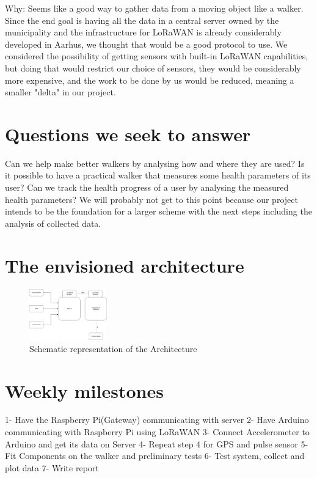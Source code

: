 \documentclass[conference]{IEEEtran}
\begin{document}
Why: Seems like a good way to gather data from a moving object like a walker. Since the end goal is having all the data in a central server owned by the municipality and the infrastructure for LoRaWAN is already considerably developed in Aarhus, we thought that would be a good protocol to use. We considered the possibility of getting sensors with built-in LoRaWAN capabilities, but doing that would restrict our choice of sensors, they would be considerably more expensive, and the work to be done by us would be reduced, meaning a smaller "delta" in our project.
\section{Questions we seek to answer}
	Can we help make better walkers by analysing how and where they are used?
Is it possible to have a practical walker that measures some health parameters of its user? 
Can we track the health progress of a user by analysing the measured health parameters? We will probably not get to this point because our project intends to be the foundation for a larger scheme with the next steps including the analysis of collected data.

\section{The envisioned architecture}

\begin{figure}[H]
	\begin{center}
		\includegraphics[width=0.3\textwidth]{images/Architecture.png}
		\caption[]{Schematic representation of the Architecture}
	\end{center}	
\end{figure}
\section{Weekly milestones}
	1- Have the Raspberry Pi(Gateway) communicating with server
2- Have Arduino communicating with Raspberry Pi using LoRaWAN
3- Connect Accelerometer to Arduino and get its data on Server
4- Repeat step 4 for GPS and pulse sensor
5- Fit Components on the walker and preliminary tests
6- Test system, collect and plot data
7- Write report




\end{document}

